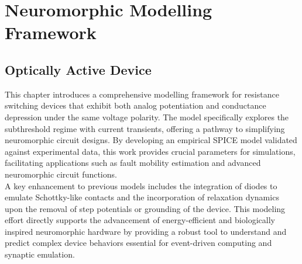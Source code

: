 \chapter{Neuromorphic Modelling Framework}

\section[Optically Active Device]{Optically Active Device}



This chapter introduces a comprehensive modelling framework for resistance switching devices that exhibit both analog potentiation and conductance depression under the same voltage polarity. The model specifically explores the subthreshold regime with current transients, offering a pathway to simplifying neuromorphic circuit designs. By developing an empirical SPICE model validated against experimental data, this work provides crucial parameters for simulations, facilitating applications such as fault mobility estimation and advanced neuromorphic circuit functions. \\

\noindent A key enhancement to previous models includes the integration of diodes to emulate Schottky-like contacts and the incorporation of relaxation dynamics upon the removal of step potentials or grounding of the device. This modeling effort directly supports the advancement of energy-efficient and biologically inspired neuromorphic hardware by providing a robust tool to understand and predict complex device behaviors essential for event-driven computing and synaptic emulation.

